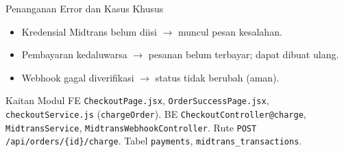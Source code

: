 \begin{flowsection}{Penanganan Error dan Kasus Khusus}
\begin{itemize}
  \item Kredensial Midtrans belum diisi $\rightarrow$ muncul pesan kesalahan.
  \item Pembayaran kedaluwarsa $\rightarrow$ pesanan belum terbayar; dapat dibuat ulang.
  \item Webhook gagal diverifikasi $\rightarrow$ status tidak berubah (aman).
\end{itemize}
\end{flowsection}

\begin{flowsection}{Kaitan Modul}
FE \texttt{CheckoutPage.jsx}, \texttt{OrderSuccessPage.jsx}, \texttt{checkoutService.js}
(\texttt{chargeOrder}). BE \texttt{CheckoutController@charge},
\texttt{MidtransService}, \texttt{MidtransWebhookController}. Rute
\texttt{POST /api/orders/\{id\}/charge}. Tabel \texttt{payments},
\texttt{midtrans\_transactions}.
\end{flowsection}

